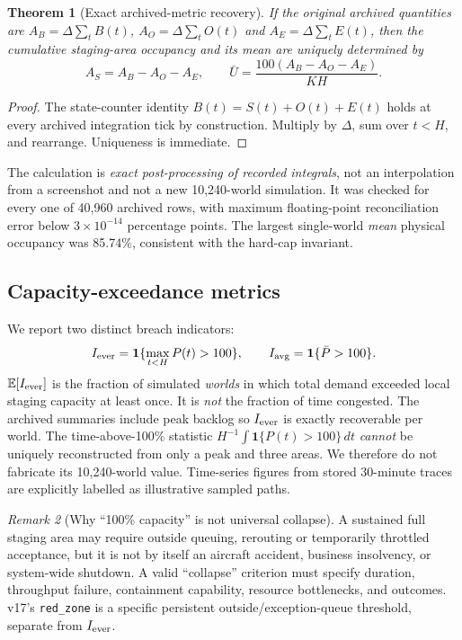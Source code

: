 \documentclass[10pt,a4paper]{article}
\newtheorem{theorem}{Theorem}[section]
\theoremstyle{definition}\newtheorem{definition}[theorem]{Definition}
\theoremstyle{remark}\newtheorem{remark}[theorem]{Remark}
\newcommand{\E}{\mathbb E}
\newcommand{\1}{\mathbbm 1}
\begin{document}
\begin{theorem}[Exact archived-metric recovery]\label{thm:recovery}
If the original archived quantities are $A_B=\Delta\sum_tB(t)$, $A_O=\Delta\sum_tO(t)$ and $A_E=\Delta\sum_tE(t)$, then the cumulative staging-area occupancy and its mean are uniquely determined by
\begin{equation}\label{eq:recon}A_S=A_B-A_O-A_E,\qquad\bar U=\frac{100(A_B-A_O-A_E)}{KH}.
\end{equation}
\end{theorem}
\begin{proof}The state-counter identity $B(t)=S(t)+O(t)+E(t)$ holds at every archived integration tick by construction. Multiply by $\Delta$, sum over $t<H$, and rearrange. Uniqueness is immediate.\end{proof}

The calculation is \emph{exact post-processing of recorded integrals}, not an interpolation from a screenshot and not a new 10,240-world simulation. It was checked for every one of 40,960 archived rows, with maximum floating-point reconciliation error below $3\times10^{-14}$ percentage points. The largest single-world \emph{mean} physical occupancy was 85.74\%, consistent with the hard-cap invariant.

\subsection{Capacity-exceedance metrics}
We report two distinct breach indicators:
\begin{equation}I_{\rm ever}=\mathbf1\{\max_{t<H}P(t)>100\},\qquad I_{\rm avg}=\mathbf1\{\bar P>100\}.\end{equation}
$\E[I_{\rm ever}]$ is the fraction of simulated \emph{worlds} in which total demand exceeded local staging capacity at least once. It is \emph{not} the fraction of time congested. The archived summaries include peak backlog so $I_{\rm ever}$ is exactly recoverable per world. The time-above-100\% statistic $H^{-1}\int\mathbf1\{P(t)>100\}\,dt$ \emph{cannot} be uniquely reconstructed from only a peak and three areas. We therefore do not fabricate its 10,240-world value. Time-series figures from stored 30-minute traces are explicitly labelled as illustrative sampled paths.

\begin{remark}[Why ``100\% capacity'' is not universal collapse]\label{rem:threshold}
A sustained full staging area may require outside queuing, rerouting or temporarily throttled acceptance, but it is not by itself an aircraft accident, business insolvency, or system-wide shutdown. A valid ``collapse'' criterion must specify duration, throughput failure, containment capability, resource bottlenecks, and outcomes. v17's \texttt{red\_zone} is a specific persistent outside/exception-queue threshold, separate from $I_{\rm ever}$.
\end{remark}
\end{document}

